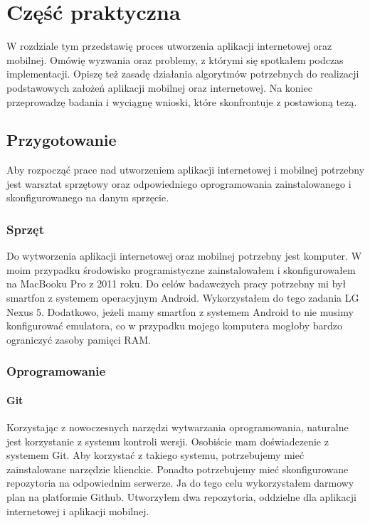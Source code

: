 \chapter{Część praktyczna}
W rozdziale tym przedstawię proces utworzenia aplikacji internetowej oraz mobilnej. Omówię wyzwania oraz problemy, z którymi się spotkałem podczas implementacji. Opiszę też zasadę działania algorytmów potrzebnych do realizacji podstawowych założeń aplikacji mobilnej oraz internetowej. Na koniec przeprowadzę badania i wyciągnę wnioski, które skonfrontuje z postawioną tezą.

\section{Przygotowanie}
Aby rozpocząć prace nad utworzeniem aplikacji internetowej i mobilnej potrzebny jest warsztat sprzętowy oraz odpowiedniego oprogramowania zainstalowanego i skonfigurowanego na danym sprzęcie.

\subsection{Sprzęt}
Do wytworzenia aplikacji internetowej oraz mobilnej potrzebny jest komputer. W moim przypadku środowisko programistyczne zainstalowałem i skonfigurowałem na MacBooku Pro z 2011 roku. Do celów badawczych pracy potrzebny mi był smartfon z systemem operacyjnym Android. Wykorzystałem do tego zadania LG Nexus 5. Dodatkowo, jeżeli mamy smartfon z systemem Android to nie musimy konfigurować emulatora, co w przypadku mojego komputera mogłoby bardzo ograniczyć zasoby pamięci RAM.

\subsection{Oprogramowanie}
\subsubsection{Git}
Korzystając z nowoczesnych narzędzi wytwarzania oprogramowania, naturalne jest korzystanie z systemu kontroli wersji. Osobiście mam doświadczenie z systemem Git. Aby korzystać z takiego systemu, potrzebujemy mieć zainstalowane narzędzie klienckie. Ponadto potrzebujemy mieć skonfigurowane repozytoria na odpowiednim serwerze. Ja do tego celu wykorzystałem darmowy plan na platformie Github. Utworzyłem dwa repozytoria, oddzielne dla aplikacji internetowej i aplikacji mobilnej.

